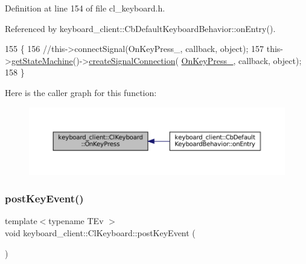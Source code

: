 Definition at line 154 of file cl\+\_\+keyboard.\+h.



Referenced by keyboard\+\_\+client\+::\+Cb\+Default\+Keyboard\+Behavior\+::on\+Entry().


\begin{DoxyCode}
155         \{
156                 \textcolor{comment}{//this->connectSignal(OnKeyPress\_, callback, object);}
157                 this->\hyperlink{classsmacc_1_1ISmaccClient_aec51d4712404cb9882b86e4c854bb93a}{getStateMachine}()->\hyperlink{classsmacc_1_1ISmaccStateMachine_adf0f42ade0c65cc471960fe2a7c42da2}{createSignalConnection}(
      \hyperlink{classkeyboard__client_1_1ClKeyboard_a0fcb5b4432b26b8c8ca6924e8e82fbeb}{OnKeyPress\_}, callback, \textcolor{keywordtype}{object});
158         \}
\end{DoxyCode}
Here is the caller graph for this function\+:
\nopagebreak
\begin{figure}[H]
\begin{center}
\leavevmode
\includegraphics[width=350pt]{classkeyboard__client_1_1ClKeyboard_a09581faae1ada2cdd53010ebb9a2197a_icgraph}
\end{center}
\end{figure}
\mbox{\label{classkeyboard__client_1_1ClKeyboard_ad62d3548adfeca7f31469a283454dbeb}} 
\subsubsection{\texorpdfstring{post\+Key\+Event()}{postKeyEvent()}}
{\footnotesize\ttfamily template$<$typename T\+Ev $>$ \\
void keyboard\+\_\+client\+::\+Cl\+Keyboard\+::post\+Key\+Event (\begin{DoxyParamCaption}{ }\end{DoxyParamCaption})\hspace{0.3cm}{\ttfamily [inline]}}



